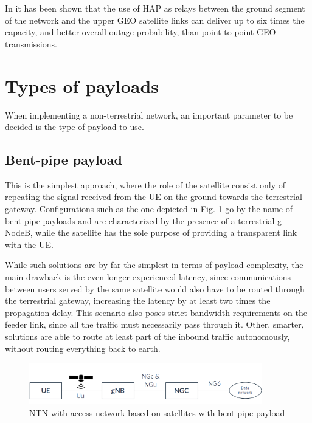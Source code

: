 In \cite{potential-multilayered-nierarchical-ntn-wang} it has been shown that the use of \ac{HAP} as relays between the ground segment of the network and the upper \ac{GEO} satellite links can deliver up to six times the capacity, and better overall outage probability, than point-to-point \ac{GEO} transmissions.


\section{Types of payloads}
When implementing a non-terrestrial network, an important parameter to be decided is the type of payload to use.

\subsection{Bent-pipe payload}
This is the simplest approach, where the role of the satellite consist only of  repeating the signal received from the \ac{UE} on the ground towards the terrestrial gateway. Configurations such as the one depicted in Fig. \ref{fig:ntn-bent-pipe} go by the name of bent pipe payloads and are characterized by the presence of a terrestrial g-NodeB, while the satellite has the sole purpose of providing a transparent link with the \ac{UE}.

While such solutions are by far the simplest in terms of payload complexity, the main drawback is the even longer experienced latency, since communications between users served by the same satellite would also have to be routed through the terrestrial gateway, increasing the latency by at least two times the propagation delay.
This scenario also poses strict bandwidth requirements on the feeder link, since all the traffic must necessarily pass through it.
Other, smarter, solutions are able to route at least part of the inbound traffic autonomously, without routing everything back to earth.

\begin{figure}[ht]
    \centering
    \includegraphics[width=0.9\textwidth]{res/ntn-bent-pipe.png}
    \caption{NTN with access network based on satellites with bent pipe payload \cite{3gpp-tr-38.811}}
    \label{fig:ntn-bent-pipe}
\end{figure}

